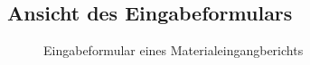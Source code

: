 \subsection{Ansicht des Eingabeformulars}
\label{subsec:Screenshot}

\begin{figure}[htb]
\centering
{}
\caption{Eingabeformular eines Materialeingangberichts}
\end{figure}
